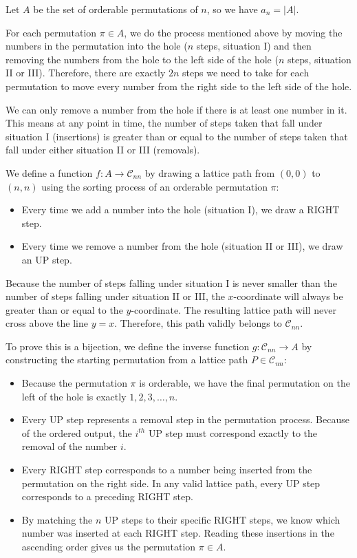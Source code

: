 \documentclass[10pt]{article}
\begin{document}
\begin{enumerate}
\begin{enumerate}
    Let $A$ be the set of orderable permutations of $n$, so we have $a_n = |A|$. 
    
    For each permutation $\pi \in A$, we do the process mentioned above by moving the numbers in the permutation into the hole ($n$ steps, situation I) and then removing the numbers from the hole to the left side of the hole ($n$ steps, situation II or III). Therefore, there are exactly $2n$ steps we need to take for each permutation to move every number from the right side to the left side of the hole. 
    
    We can only remove a number from the hole if there is at least one number in it. This means at any point in time, the number of steps taken that fall under situation I (insertions) is greater than or equal to the number of steps taken that fall under either situation II or III (removals).
    
    We define a function $f: A \to \mathcal{C}_{nn}$ by drawing a lattice path from $(0,0)$ to $(n,n)$ using the sorting process of an orderable permutation $\pi$:
    \begin{itemize}
        \item Every time we add a number into the hole (situation I), we draw a RIGHT step.
        \item Every time we remove a number from the hole (situation II or III), we draw an UP step.
    \end{itemize}
    
    Because the number of steps falling under situation I is never smaller than the number of steps falling under situation II or III, the $x$-coordinate will always be greater than or equal to the $y$-coordinate. The resulting lattice path will never cross above the line $y=x$. Therefore, this path validly belongs to $\mathcal{C}_{nn}$.
    
    To prove this is a bijection, we define the inverse function $g: \mathcal{C}_{nn} \to A$ by constructing the starting permutation from a lattice path $P \in \mathcal{C}_{nn}$:
    \begin{itemize}
        \item Because the permutation $\pi$ is orderable, we have the final permutation on the left of the hole is exactly $1, 2, 3, \ldots, n$.
        \item Every UP step represents a removal step in the permutation process. Because of the ordered output, the $i^{th}$ UP step must correspond exactly to the removal of the number $i$.
        \item Every RIGHT step corresponds to a number being inserted from the permutation on the right side. In any valid lattice path, every UP step corresponds to a preceding RIGHT step. 
        \item By matching the $n$ UP steps to their specific RIGHT steps, we know which number was inserted at each RIGHT step. Reading these insertions in the ascending order gives us the permutation $\pi \in A$.
    \end{itemize}
    

\end{enumerate}
\end{enumerate}
\end{document}

